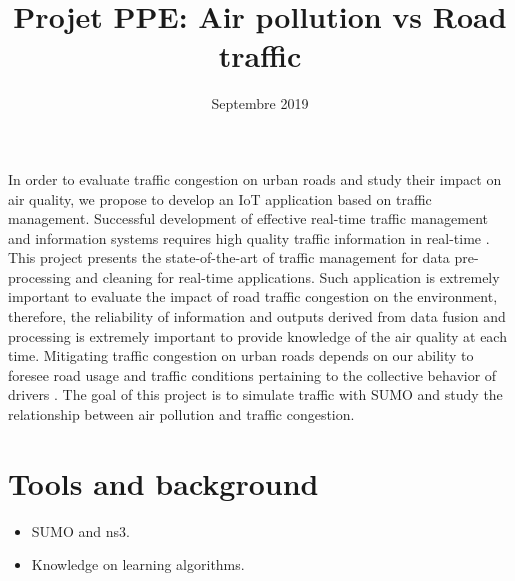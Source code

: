 \documentclass[a4paper]{article}
\title{\textbf{Projet PPE:} Air pollution vs Road traffic}
\date{Septembre 2019}
\begin{document}
\maketitle


In order to evaluate traffic congestion on urban roads and study their impact on air quality,
	we propose to develop an IoT application based on traffic management.
Successful development of effective real-time traffic management and information systems requires high quality traffic information in real-time \cite{lopes_traffic_2010}.
This project presents the state-of-the-art of traffic management for data pre-processing and cleaning for real-time applications.
Such application is extremely important to evaluate the impact of road traffic congestion on the environment,
	therefore,
	the reliability of information and outputs derived from data fusion and processing is extremely important to provide knowledge of the air quality at each time.
Mitigating traffic congestion on urban roads depends on our ability to foresee road usage and traffic conditions pertaining to the collective behavior of drivers \cite{wang_predictability_2015}.
The goal of this project is to simulate traffic with SUMO \cite{behrisch_sumo_2011} and study the relationship between air pollution and traffic congestion.


\section{Tools and background}

\begin{itemize}
	\item SUMO and ns3.
	\item Knowledge on learning algorithms.
\end{itemize}

\printbibliography


\end{document}
